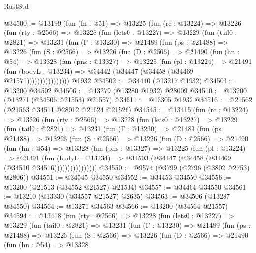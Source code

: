 \begin{lexlean}{RustStd}
\begin{coremodule}
@34500 := @13199
    (fun (fn : @51) =>
    @13225
      (fun (rc : @13224) =>
      @13226
        (fun (rty : @2566) =>
        @13228
          (fun (lets0 : @13227) =>
          @13229
            (fun (tail0 : @2821) =>
            @13231
              (fun (Γ : @13230) =>
              @21489
                (fun (ps : @21488) =>
                @13226
                  (fun (S : @2566) =>
                  @13226
                    (fun (D : @2566) =>
                    @21490
                      (fun (hn : @54) =>
                      @13328
                        (fun (pns : @13327) =>
                        @13225
                          (fun (pl : @13224) =>
                          @21491
                            (fun (bodyL : @13234) =>
                            @34442 (@34447 (@34458 (@34469 @21571))))))))))))))))
    @1932
@34502 := @34440 (@13217 @1932)
@34503 := @13200 @34502
@34506 := @13279 (@13280 @1932) @28009
@34510 := @13200 (@13271 (@34506 @21553) @21557)
@34511 := @13305 @1932
@34516 := @21562 (@21563 @34511 @28012 @21524 @21526)
@34545 := @13415
    (fun (rc : @13224) =>
    @13226
      (fun (rty : @2566) =>
      @13228
        (fun (lets0 : @13227) =>
        @13229
          (fun (tail0 : @2821) =>
          @13231
            (fun (Γ : @13230) =>
            @21489
              (fun (ps : @21488) =>
              @13226
                (fun (S : @2566) =>
                @13226
                  (fun (D : @2566) =>
                  @21490
                    (fun (hn : @54) =>
                    @13328
                      (fun (pns : @13327) =>
                      @13225
                        (fun (pl : @13224) =>
                        @21491
                          (fun (bodyL : @13234) =>
                          @34503 (@34447 (@34458 (@34469 (@34510 @34516))))))))))))))))
@34550 := @9574 (@3799 (@2796 (@3802 @2753) @2806))
@34551 := @34545 @34550
@34552 := @34453 @34550
@34556 := @13200 (@21513 (@34552 @21527) @21534)
@34557 := @34464 @34550
@34561 := @13200 (@13330 (@34557 @21527) @2635)
@34563 := @34506 (@13287 @34550)
@34564 := @13271 @34563
@34566 := @13200 (@34564 @21557)
@34594 := @13418
    (fun (rty : @2566) =>
    @13228
      (fun (lets0 : @13227) =>
      @13229
        (fun (tail0 : @2821) =>
        @13231
          (fun (Γ : @13230) =>
          @21489
            (fun (ps : @21488) =>
            @13226
              (fun (S : @2566) =>
              @13226
                (fun (D : @2566) =>
                @21490
                  (fun (hn : @54) =>
                  @13328

\end{coremodule}
\end{lexlean}

